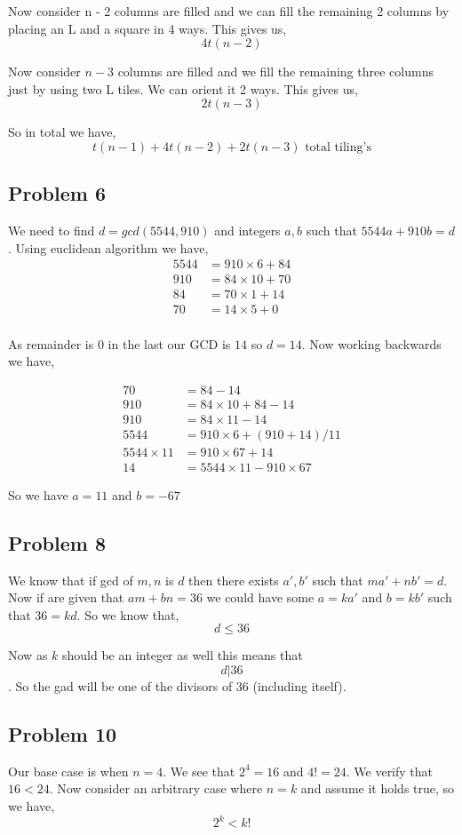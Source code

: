 \documentclass[a4paper]{report}
\begin{document}
Now consider n - 2 columns are filled and we can fill the remaining 2 columns by placing an L and a square in 4 ways. This gives us, 
$$ 4t(n - 2) $$ 

Now consider $n - 3$ columns are filled and we fill the remaining three columns just by using two L tiles. We can orient it 2 ways. This gives us, 
$$ 2t(n - 3) $$ 

So in total we have, 
$$ t(n - 1) + 4t(n - 2) + 2t(n - 3) \text{ total tiling's} $$ 
\subsection*{Problem 6}
We need to find $d = gcd(5544, 910)$ and integers  $a,b$ such that $5544a + 910b = d$. Using euclidean algorithm we have,  
\begin{align*}
    5544 &= 910 \times 6 + 84\\
    910 &= 84 \times 10 + 70\\
    84 &= 70 \times 1 + 14\\
    70 &= 14 \times 5 + 0\\
\end{align*}

As remainder is 0 in the last our GCD is $14$ so  $d = 14$. Now working backwards we have,  

\begin{align*}
    70 &= 84 - 14\\
    910 &= 84 \times 10 + 84 - 14\\
    910 &= 84 \times 11 - 14\\
    5544 &= 910 \times  6 + (910 + 14) /11\\
    5544 \times 11 &= 910 \times  67+ 14 \\
    14 &= 5544 \times  11 - 910 \times  67
\end{align*}

So we have $a = 11$ and $b = -67$


\subsection*{Problem 8}
We know that if gcd of $m,n$ is  $d$ then there exists  $a',b'$ such that  $ma' + nb' = d$. Now if are given that  $am + bn = 36$ we could have some  $a = ka'$ and  $b = kb'$ such that  $36 = kd$. So we know that,  
$$d \le 36$$ 

Now as $k$ should be an integer as well this means that $$d | 36$$. So the gad will be one of the divisors of 36 (including itself).
\subsection*{Problem 10}
Our base case is when $n = 4$. We see that $2^{4} = 16$ and $4! = 24$. We verify that  $16 < 24$. Now consider  an arbitrary case where  $n = k$  and assume it holds true, so we have, 
$$ 2^{k} < k! $$ 
\end{document}
